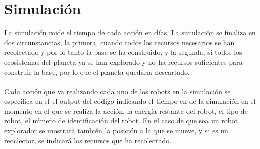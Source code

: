 \documentclass[a4paper,12pt]{article}
\begin{document}
\section{Simulación}
La simulación mide el tiempo de cada acción en días. La simulación se finaliza en dos circunstancias, la primera, cuando todos los recursos necesarios se han recolectado y por lo tanto la base se ha construido, y la segunda, si todos los ecosistemas del planeta ya se han explorado y no ha recursos suficientes para construir la base, por lo que el planeta quedaría descartado.
\\\\
Cada acción que va realizando cada uno de los robots en la simulación se especifica en el el output del código indicando el tiempo en de la simulación en el momento en el que se realiza la acción, la energía restante del robot, el tipo de robot, el número de identificación del robot. En el caso de que sea un robot explorador se mostrará también la posición a la que se mueve, y si es un reoclector, se indicará los recursos que ha recolectado.
\end{document}
